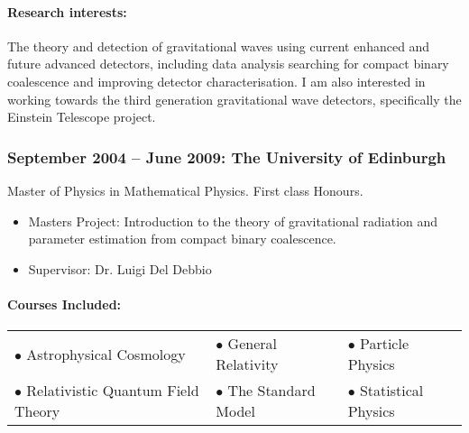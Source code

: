 \documentclass{article}
\begin{document}
\paragraph{Research interests:} The theory and detection of gravitational waves using current enhanced and future advanced detectors, including data analysis searching for compact binary coalescence and improving detector characterisation. I am also interested in working towards the third generation gravitational wave detectors, specifically the Einstein Telescope project.

\subsubsection*{September 2004 -- June 2009: The University of Edinburgh}
Master of Physics in Mathematical Physics. First class Honours.
\begin{itemize}
\item Masters Project: Introduction to the theory of gravitational radiation and parameter estimation from compact binary coalescence.
\item Supervisor: Dr. Luigi Del Debbio
\end{itemize}
\paragraph{Courses Included:}
\begin{center}
\begin{tabular}{lll}
$\bullet$ Astrophysical Cosmology & $\bullet$ General Relativity & $\bullet$ Particle Physics \\ $\bullet$ Relativistic Quantum Field Theory & $\bullet$ The Standard Model & $\bullet$ Statistical Physics
\end{tabular}
\end{center}
\end{document}
